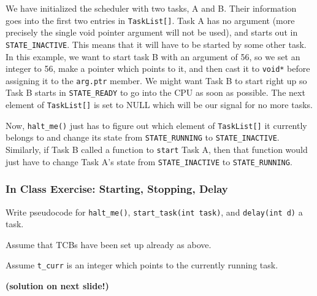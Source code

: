 We have initialized the scheduler with two tasks, A and B.  Their information goes into the first two entries in {\tt TaskList[]}.   Task A has no argument (more precisely the single void pointer argument will not be used), and starts out in {\tt STATE\_INACTIVE}.   This means that it will have to be started by some other task.   In this example, we want to start task B with an argument of 56, so we set an integer to 56, make a pointer which points to it, and then cast it to {\tt void*} before assigning it to the {\tt arg.ptr} member.   We might want Task B to start right up so Task B starts in {\tt STATE\_READY} to
go into the CPU as soon as possible.   The next element of {\tt TaskList[]} is set to NULL which will be our signal for no more tasks. 

Now, {\tt halt\_me()} just has to figure out which element of {\tt TaskList[]} it currently belongs to and change its state from {\tt STATE\_RUNNING} to {\tt STATE\_INACTIVE}.   Similarly, if Task B called a function to {\tt start} Task A, then that function would just have to change Task A's state from {\tt STATE\_INACTIVE} to {\tt STATE\_RUNNING}.
\subsubsection*{In Class Exercise: Starting, Stopping, Delay}
 Write pseudocode for {\tt halt\_me()}, {\tt start\_task(int task)},  and {\tt delay(int d)} a task.  
 
 Assume that TCBs have been set up already as above.
 
 Assume {\tt t\_curr} is an integer which points to the currently running task.
 
\vspace{0.5in}
{\bf (solution on next slide!) }

\vspace{5.0in}	%
%
%
%
%
%
% 
%
